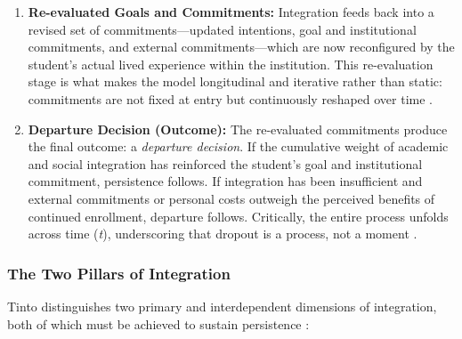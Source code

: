 \documentclass[12pt]{report}
\begin{document}
\begin{enumerate}
    \item \textbf{Re-evaluated Goals and Commitments:} Integration feeds back
    into a revised set of commitments---updated intentions, goal and institutional
    commitments, and external commitments---which are now reconfigured by the
    student's actual lived experience within the institution. This re-evaluation
    stage is what makes the model longitudinal and iterative rather than static:
    commitments are not fixed at entry but continuously reshaped over time
    \parencite{Nicoletti2019, Tinto1993}.

    \item \textbf{Departure Decision (Outcome):} The re-evaluated commitments
    produce the final outcome: a \textit{departure decision}. If the cumulative
    weight of academic and social integration has reinforced the student's goal
    and institutional commitment, persistence follows. If integration has been
    insufficient and external commitments or personal costs outweigh the perceived
    benefits of continued enrollment, departure follows. Critically, the entire
    process unfolds across time (\textit{t}), underscoring that dropout is a
    process, not a moment \parencite{tinto1975}.
\end{enumerate}

\subsubsection{The Two Pillars of Integration}

Tinto distinguishes two primary and interdependent dimensions of integration,
both of which must be achieved to sustain persistence \parencite{Tinto1993}:
\end{document}
